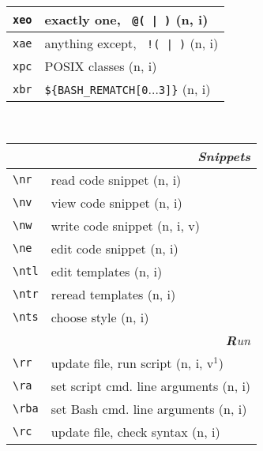 \documentclass[oneside,10pt,landscape,DIV17]{scrartcl}
\begin{document}
\begin{multicols}{3}
\begin{center}
\begin{tabular}[]{|p{11mm}|p{60mm}|}
\hline     \verb'xeo' & exactly one,      \verb' @( | )'  \hfill (n, i)\\ 
\hline     \verb'xae' & anything except,  \verb' !( | )'  \hfill (n, i)\\ 
\hline     \verb'xpc' &  POSIX classes                  \hfill (n, i)\\ 
\hline     \verb'xbr' &  \verb'${BASH_REMATCH[0'$\ldots$\verb'3]}'  \hfill (n, i)\\ 
\hline
%
\end{tabular}\\
%
%
\begin{tabular}[]{|p{11mm}|p{62mm}|}
%
\hline
\multicolumn{2}{|r|}{\textsl{S\textbf{n}ippets}}               \\[1.0ex]
\hline \verb'\nr'  & read code snippet         \hfill (n, i)\\
\hline \verb'\nv'  & view code snippet         \hfill (n, i)\\
\hline \verb'\nw'  & write code snippet        \hfill (n, i, v)\\
\hline \verb'\ne'  & edit code snippet         \hfill (n, i)\\
\hline \verb'\ntl' & edit templates            \hfill (n, i)\\
\hline \verb'\ntr' & reread templates          \hfill (n, i)\\
\hline \verb'\nts' & choose style              \hfill (n, i)\\
\hline
\hline
\multicolumn{2}{|r|}{\textsl{\textbf{R}un}} \\[1.0ex]
\hline \verb'\rr'  & update file, run script           \hfill (n, i, v$^1$)\\
\hline \verb'\ra'  & set script cmd. line arguments    \hfill (n, i)\\
\hline \verb'\rba' & set Bash cmd. line arguments      \hfill (n, i)\\
\hline \verb'\rc'  & update file, check syntax         \hfill (n, i)\\

\end{tabular}
\end{center}
\end{multicols}
\end{document}
